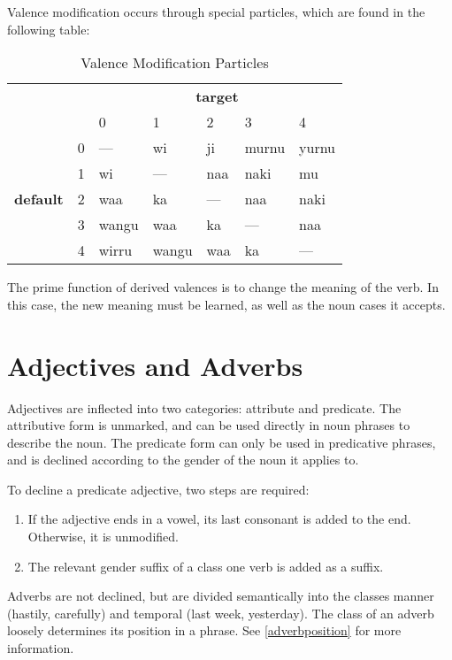 Valence modification occurs through special particles, which are found in the
following table:

\begin{table}[h]
\centering
\begin{tabular}{lllllll}
                                  &   & \multicolumn{5}{c}{\textbf{target}} \\
                                  &   & 0     & 1     & 2   & 3     & 4     \\
\multirow{5}{*}{\textbf{default}} & 0 & ---   & wi    & ji  & murnu & yurnu \\
                                  & 1 & wi    & ---   & naa & naki  & mu    \\
                                  & 2 & waa   & ka    & --- & naa   & naki  \\
                                  & 3 & wangu & waa   & ka  & ---   & naa   \\
                                  & 4 & wirru & wangu & waa & ka    & ---
\end{tabular}
\caption{Valence Modification Particles}
\end{table}

The prime function of derived valences is to change the meaning of the verb. In
this case, the new meaning must be learned, as well as the noun cases it
accepts.

\section{Adjectives and Adverbs}

Adjectives are inflected into two categories: attribute and predicate. The
attributive form is unmarked, and can be used directly in noun phrases to
describe the noun. The predicate form can only be used in predicative phrases,
and is declined according to the gender of the noun it applies to.

To decline a predicate adjective, two steps are required:

\begin{enumerate}
\item If the adjective ends in a vowel, its last consonant is added to the end. Otherwise, it is unmodified.
\item The relevant gender suffix of a class one verb is added as a suffix.
\end{enumerate}

Adverbs are not declined, but are divided semantically into the classes manner
(hastily, carefully) and temporal (last week, yesterday). The class of an adverb
loosely determines its position in a phrase. See \ref{adverbposition} for more
information.
